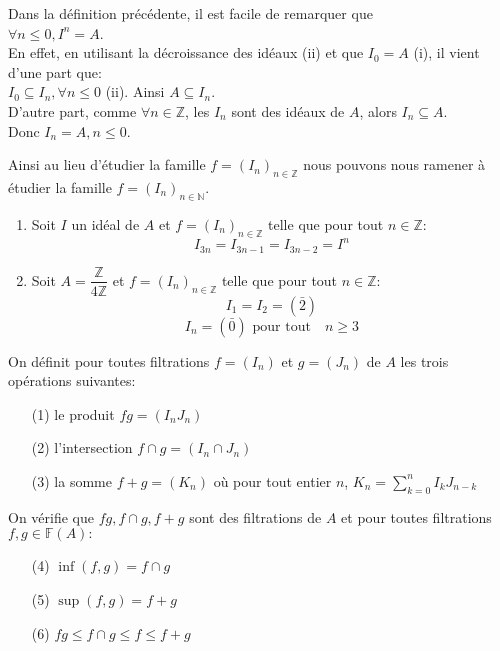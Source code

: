 \begin{maremarque}
	Dans la définition précédente, il est facile de remarquer que\\ $\forall n \leq 0, I^n = A$.\\ En effet, en utilisant la décroissance des idéaux (ii) et que $I_0 = A$ (i), il vient d'une part que:\\ $I_0 \subseteq I_n , \forall n \leq 0$ (ii). Ainsi $A \subseteq I_n$.\\
	D'autre part, comme $\forall n \in \mathbb{Z}$, les $I_n$ sont des idéaux de $A$, alors $I_n \subseteq A$.\\
	Donc $I_n = A, n \leq 0$.
\end{maremarque}
Ainsi au lieu d'étudier la famille $f = (I_n)_{n \in \mathbb{Z}}$ nous pouvons nous ramener à étudier la famille $f = (I_n)_{n \in \mathbb{N}}$.

\begin{monexemple}
	\begin{enumerate}
		\item 	Soit $I$ un idéal de $A$ et $f=(I_n)_{n \in \mathbb{Z}}$ telle que pour tout $n \in \mathbb{Z}$:
		$$I_{3n} = I_{3n-1} = I_{3n-2} =I^{n} $$
		\item 	Soit $A = \dfrac{\mathbb{Z}}{4 \mathbb{Z}} $ et $f=(I_n)_{n \in \mathbb{Z}}$ telle que pour tout $n \in \mathbb{Z}$:
		$$I_1 = I_2 = (\bar{2})$$
		$$I_n = (\bar{0})  \text{ pour tout} \quad n \geqslant 3 $$
	\end{enumerate}
\end{monexemple}
\begin{madefinition}
	On définit pour toutes filtrations $f=(I_n)$ et $g=(J_n)$ de $A$ les trois opérations suivantes: 
	\begin{enumerate}
		\item[(1)] le produit $fg=(I_nJ_n)$
		\item[(2)] l'intersection $f \cap g = (I_n \cap J_n)$
		\item[(3)] la somme $f+g=(K_n)$ où pour tout entier $n$, $K_n =\displaystyle  \sum_{k=0}^{n}I_{k}J_{n-k} $
	\end{enumerate}
	On vérifie que $fg, f \cap g , f + g$ sont des filtrations de $A$ et pour toutes filtrations \\ $f,g \in \mathbb{F}(A):$
		\begin{enumerate}
		\item[(4)] $\inf (f,g) = f \cap g$
		\item[(5)] $\sup (f,g) = f+g $
		\item[(6)] $fg \leqslant f \cap g \leqslant f \leqslant f+g$
	\end{enumerate}
\end{madefinition}

